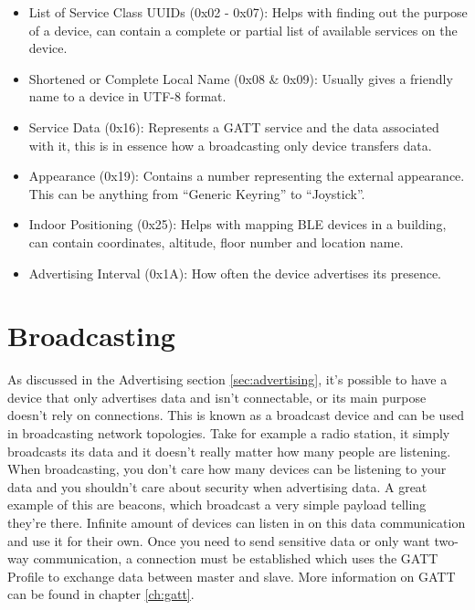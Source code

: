 \documentclass[pdftex,a4paper,12pt,twoside]{report}
\begin{document}
\begin{itemize}
	\item {List of Service Class UUIDs (0x02 - 0x07): Helps with finding out the purpose of a device, can contain a complete or partial list of available services on the device.}
	\item {Shortened or Complete Local Name (0x08 \& 0x09): Usually gives a friendly name to a device in UTF-8 format.}
	\item {Service Data (0x16): Represents a GATT service and the data associated with it, this is in essence how a broadcasting only device transfers data.}
	\item {Appearance (0x19): Contains a number representing the external appearance. This can be anything from ``Generic Keyring'' to ``Joystick''.}
	\item {Indoor Positioning (0x25): Helps with mapping BLE devices in a building, can contain coordinates, altitude, floor number and location name.}
	\item {Advertising Interval (0x1A): How often the device advertises its presence.}
\end{itemize}

\section{Broadcasting}
\label{sec:broadcasting}
As discussed in the Advertising section \ref{sec:advertising}, it's possible to have a device that only advertises data and isn't connectable, or its main purpose doesn't rely on connections. This is known as a broadcast device and can be used in broadcasting network topologies. Take for example a radio station, it simply broadcasts its data and it doesn't really matter how many people are listening. When broadcasting, you don't care how many devices can be listening to your data and you shouldn't care about security when advertising data. A great example of this are beacons, which broadcast a very simple payload telling they're there. Infinite amount of devices can listen in on this data communication and use it for their own. Once you need to send sensitive data or only want two-way communication, a connection must be established which uses the GATT Profile to exchange data between master and slave. More information on GATT can be found in chapter \ref{ch:gatt}.
\end{document}
